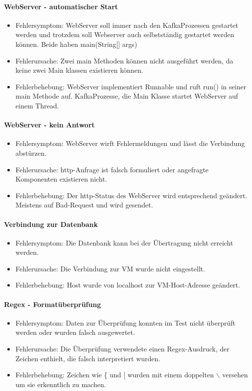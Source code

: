 \paragraph{WebServer - automatischer Start}
\begin{itemize}
	\item Fehlersymptom: WebServer soll immer nach den KafkaProzessen gestartet werden und trotzdem soll Webserver auch selbstständig gestartet werden können.
	Beide haben main(String[] args)
	\item Fehlerursache: Zwei main Methoden können nicht ausgeführt werden, da keine zwei Main klassen existieren können.
	\item Fehlerbehebung: WebServer implementiert Runnable und ruft run() in seiner main Methode auf.
	KafkaProzesse, die Main Klasse startet WebServer auf einem Thread.
\end{itemize}

\paragraph{WebServer - kein Antwort}
\begin{itemize}
	\item Fehlersymptom: WebServer wirft Fehlermeldungen und lässt die Verbindung abstürzen.
	\item Fehlerursache: http-Anfrage ist falsch formuliert oder angefragte Komponenten existieren nicht.
	\item Fehlerbehebung: Der http-Status des WebServer wird entsprechend geändert. Meistens auf Bad-Request und wird gesendet.
\end{itemize}

\paragraph{Verbindung zur Datenbank}
\begin{itemize}
	\item Fehlersymptom: Die Datenbank kann bei der Übertragung nicht erreicht werden.
	\item Fehlerursache: Die Verbindung zur VM wurde nicht eingestellt.
	\item Fehlerbehebung: Host wurde von localhost zur VM-Host-Adresse geändert.
\end{itemize}

\paragraph{Regex - Formatüberprüfung}
\begin{itemize}
	\item Fehlersymptom: Daten zur Überprüfung konnten im Test nicht überprüft werden oder wurden falsch ausgewertet.
	\item Fehlerursache: Die Überprüfung verwendete einen Regex-Ausdruck, der Zeichen enthielt, die falsch interpretiert wurden.
	\item Fehlerbehebung: Zeichen wie \{ und [ wurden mit einem doppelten $\backslash$ versehen um sie erkenntlich zu machen.
\end{itemize}

